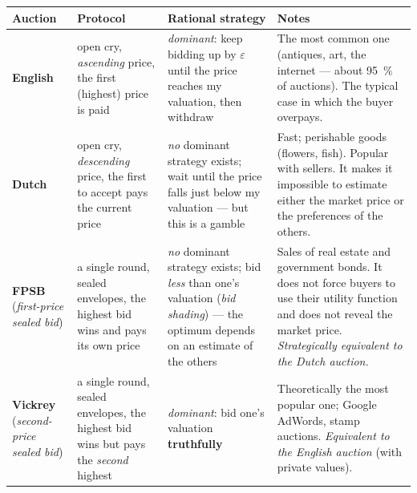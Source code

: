 \documentclass[11pt,a4paper]{article}
\theoremstyle{definition}
\begin{document}
\begin{center}\small
\begin{tabular}{@{}p{}
  >{\raggedright\arraybackslash}p{}
  >{\raggedright\arraybackslash}p{}
  >{\raggedright\arraybackslash}p{}@{}}
\toprule
\textbf{Auction} & \textbf{Protocol} & \textbf{Rational strategy} & \textbf{Notes} \\
\midrule
\textbf{English}
  & open cry, \emph{ascending} price, the first (highest) price is paid
  & \emph{dominant}: keep bidding up by $\varepsilon$ until the price reaches my valuation,
    then withdraw
  & The most common one (antiques, art, the internet --- about 95~\% of auctions). The typical case in
    which the buyer overpays. \\
\textbf{Dutch}
  & open cry, \emph{descending} price, the first to accept pays the current price
  & \emph{no} dominant strategy exists; wait until the price falls just below my valuation ---
    but this is a gamble
  & Fast; perishable goods (flowers, fish). Popular with sellers.
    It makes it impossible to estimate either the market price or the preferences of the others. \\
\textbf{FPSB} \newline (\emph{first-price sealed bid})
  & a single round, sealed envelopes, the highest bid wins and pays its own price
  & \emph{no} dominant strategy exists; bid \emph{less} than one's valuation
    (\emph{bid shading}) --- the optimum depends on an estimate of the others
  & Sales of real estate and government bonds. It does not force buyers to use their utility function
    and does not reveal the market price. \emph{Strategically equivalent to the Dutch auction.} \\
\textbf{Vickrey} \newline (\emph{second-price sealed bid})
  & a single round, sealed envelopes, the highest bid wins but pays the \emph{second} highest
  & \emph{dominant}: bid one's valuation \textbf{truthfully}
  & Theoretically the most popular one; Google AdWords, stamp auctions.
    \emph{Equivalent to the English auction} (with private values). \\
\bottomrule
\end{tabular}
\end{center}
\end{document}
